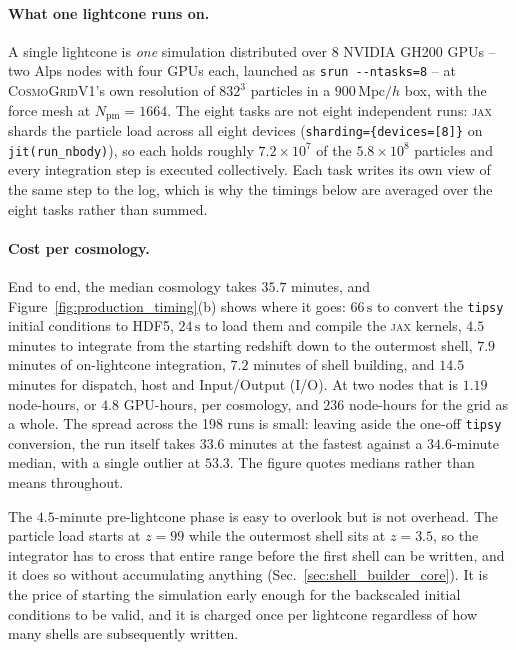 \documentclass{report}
\begin{document}
\paragraph{What one lightcone runs on.} A single lightcone is \emph{one} simulation
distributed over \mbox{$8$} NVIDIA GH200 GPUs -- two Alps nodes with four GPUs each,
launched as \texttt{srun -{}-ntasks=8} -- at \textsc{CosmoGridV1}'s own resolution of
\mbox{$832^3$} particles in a \mbox{$900\,\mathrm{Mpc}/h$} box, with the force mesh at
\mbox{$N_{\mathrm{pm}} = 1664$}. The eight tasks are not eight independent runs: \textsc{jax}
shards the particle load across all eight devices (\texttt{sharding=\{devices=[8]\}} on
\texttt{jit(run\_nbody)}), so each holds roughly \mbox{$7.2\times10^{7}$} of the
\mbox{$5.8\times10^{8}$} particles and every integration step is executed collectively.
Each task writes its own view of the same step to the log, which is why the timings below
are averaged over the eight tasks rather than summed.

\paragraph{Cost per cosmology.} End to end, the median cosmology takes
\mbox{$35.7$} minutes, and Figure~\ref{fig:production_timing}(b) shows where it goes:
\mbox{$66\,\mathrm{s}$} to convert the \texttt{tipsy} initial conditions to HDF5,
\mbox{$24\,\mathrm{s}$} to load them and compile the \textsc{jax} kernels,
\mbox{$4.5$} minutes to integrate from the starting redshift down to the outermost shell,
\mbox{$7.9$} minutes of on-lightcone integration, \mbox{$7.2$} minutes of shell building, and \mbox{$14.5$} minutes for dispatch, host and Input/Output (I/O). At two nodes that is \mbox{$1.19$} node-hours, or \mbox{$4.8$} GPU-hours, per
cosmology, and \mbox{$236$} node-hours for the grid as a whole. The spread across the 198
runs is small: leaving aside the one-off \texttt{tipsy} conversion, the run itself takes
\mbox{$33.6$} minutes at the fastest against a \mbox{$34.6$}-minute median, with a single
outlier at \mbox{$53.3$}. The figure quotes medians rather than means throughout.

The \mbox{$4.5$}-minute pre-lightcone phase is easy to overlook but is not overhead.
The particle load starts at \mbox{$z = 99$} while the outermost shell sits at
\mbox{$z = 3.5$}, so the integrator has to cross that entire range before the first shell can be written, and it does so without accumulating anything
(Sec.~\ref{sec:shell_builder_core}). It is the price of starting the simulation early enough for the backscaled initial conditions to be valid, and it is charged once per lightcone regardless of how many shells are subsequently written.
\end{document}
